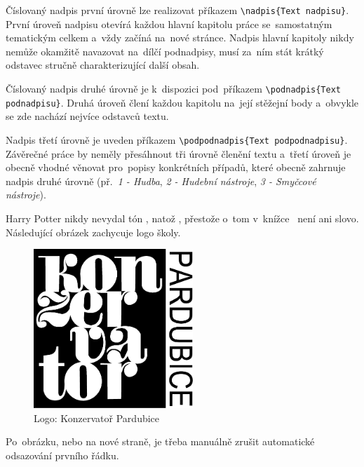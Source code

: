 Číslovaný nadpis první úrovně lze realizovat příkazem
\texttt{{\textbackslash}nadpis\{Text nadpisu\}}. První úroveň nadpisu otevírá
každou hlavní kapitolu práce se~samostatným tematickým celkem a~vždy začíná
na~nové stránce. Nadpis hlavní kapitoly nikdy nemůže okamžitě navazovat na~dílčí
podnadpisy, musí za~ním stát krátký odstavec stručně charakterizující další
obsah.

Číslovaný nadpis druhé úrovně je k~dispozici pod~příkazem
\texttt{{\textbackslash}podnadpis\{Text podnadpisu\}}. Druhá úroveň člení každou
kapitolu na~její stěžejní body a~obvykle se zde nachází nejvíce odstavců textu.

Nadpis třetí úrovně je uveden příkazem
\texttt{{\textbackslash}podpodnadpis\{Text podpodnadpisu\}}. Závěrečné práce by
neměly přesáhnout tři úrovně členění textu a~třetí úroveň je obecně vhodné
věnovat pro~popisy konkrétních případů, které obecně zahrnuje nadpis druhé
úrovně (př.~\textit{1 - Hudba}, \textit{2 - Hudební nástroje}, \textit{3 -
Smyčcové nástroje}).

Harry Potter nikdy nevydal tón , natož , přestože o~tom
v~knížce~\cite{harry} není ani slovo. Následující obrázek
zachycuje logo školy.

\begin{figure}[!ht]
	\begin{center}
		\includegraphics[width=60mm]{./obrazky/kp-logo.pdf}
    \end{center}

	\caption{Logo: Konzervatoř Pardubice}
\end{figure}

\noindent
Po~obrázku, nebo na nové straně, je třeba manuálně zrušit automatické odsazování
prvního řádku. \lipsum[5-7][12-22]

\lipsum[5-7][12-22]

\lipsum[5-7][12-22]

\lipsum[5-7][12-22]

\lipsum[5-7][12-22]

\lipsum[5-7][12-22]

\lipsum[5-7][12-22]

\lipsum[5-7][12-22]